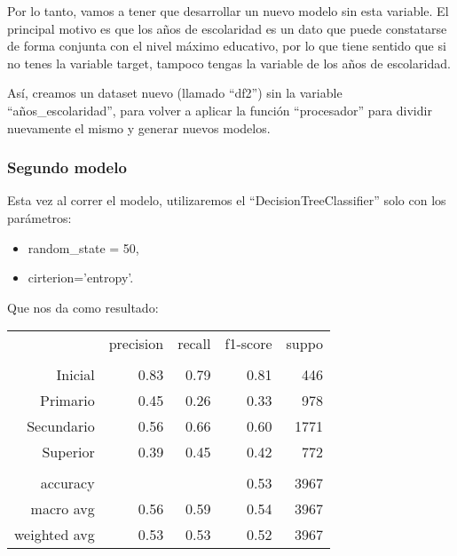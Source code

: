 \documentclass[a4paper]{article}
\begin{document}
            Por lo tanto, vamos a tener que desarrollar un nuevo modelo sin esta variable. El principal motivo es que los años de escolaridad es un dato que puede constatarse de forma conjunta con el nivel máximo educativo, por lo que tiene sentido que si no tenes la variable target, tampoco tengas la variable de los años de escolaridad.

            Así, creamos un dataset nuevo (llamado ``df2'') sin la variable ``años\_escolaridad'', para volver a aplicar la función ``procesador'' para dividir nuevamente el mismo y generar nuevos modelos.

        \subsubsection{Segundo modelo}

            Esta vez al correr el modelo, utilizaremos el ``DecisionTreeClassifier'' solo con los parámetros:
            \begin{itemize}
                \item random\_state = 50,
                \item cirterion='entropy'.
            \end{itemize}
            Que nos da como resultado:  

            \begin{table}[!ht]
                \centering
                \begin{tabular}{rrrrr}
                    ~ & precision & recall & f1-score & suppo \\
                    & & & & \\
                    Inicial    & 0.83 & 0.79 & 0.81 & 446 \\
                    Primario   & 0.45 & 0.26 & 0.33 & 978 \\
                    Secundario & 0.56 & 0.66 & 0.60 & 1771 \\
                    Superior   & 0.39 & 0.45 & 0.42 & 772 \\
                    & & & & \\
                    accuracy & & & 0.53 & 3967 \\
                    macro avg & 0.56 & 0.59 & 0.54 & 3967 \\
                    weighted avg & 0.53 & 0.53 & 0.52 & 3967 \\
                \end{tabular}
            \end{table}
\end{document}
